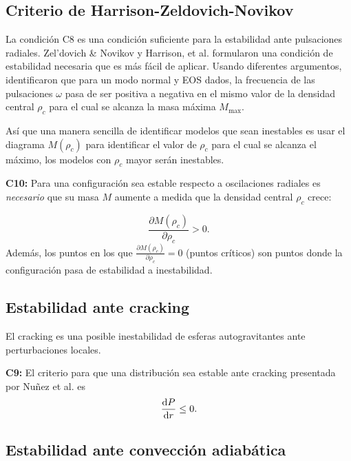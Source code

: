 \subsection*{Criterio de Harrison-Zeldovich-Novikov}

La condición C8 es una condición suficiente para la estabilidad ante pulsaciones radiales. Zel'dovich \& Novikov \cite{Zeldovich1971} y Harrison, et al. \cite{Harrison1965} formularon una condición de estabilidad necesaria que es más fácil de aplicar. Usando diferentes argumentos, identificaron que para un modo normal y EOS dados, la frecuencia de las pulsaciones $\omega$ pasa de ser positiva a negativa en el mismo valor de la densidad central $\rho_c$ para el cual se alcanza la masa máxima $M_{\text{max}}$. 

Así que una manera sencilla de identificar modelos que sean inestables es usar el diagrama $M(\rho_c)$ para identificar el valor de $\rho_c$ para el cual se alcanza el máximo, los modelos con $\rho_c$ mayor serán inestables. 

\textbf{C10:} Para una configuración sea estable respecto a oscilaciones radiales es \emph{necesario} que su masa $M$ aumente a medida que la densidad central $\rho_{c}$ crece: 

\begin{equation}
    \frac { \partial M \left( \rho _ { c } \right) } { \partial \rho _ { c } } > 0.
\end{equation}
Además, los puntos en los que $\frac { \partial M \left( \rho _ { c } \right) } { \partial \rho _ { c } } = 0$ (puntos críticos) son puntos donde la configuración pasa de estabilidad a inestabilidad.



\subsection*{Estabilidad ante cracking}
\noindent El cracking es una posible inestabilidad de esferas autogravitantes ante perturbaciones locales.

\textbf{C9:} El criterio para que una distribución sea estable ante cracking presentada por Nuñez et al. \cite{Gonzalez2014} es
\begin{equation}
    \dv{P}{r} \leq 0.
\end{equation}


\subsection*{Estabilidad ante convección adiabática}

